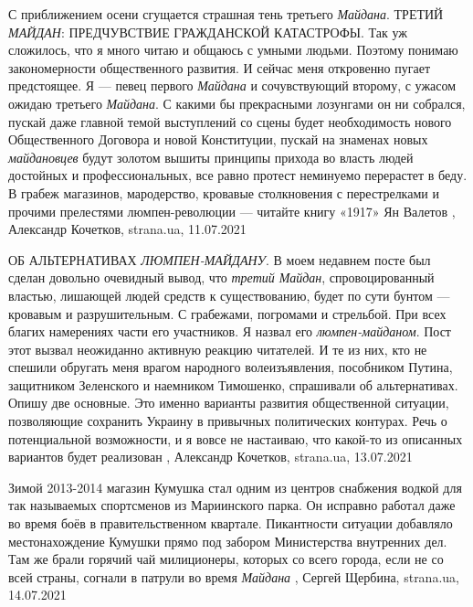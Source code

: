 С приближением осени сгущается страшная тень третьего \emph{Майдана}. ТРЕТИЙ \emph{МАЙДАН}:
ПРЕДЧУВСТВИЕ ГРАЖДАНСКОЙ КАТАСТРОФЫ.  Так уж сложилось, что я много читаю и
общаюсь с умными людьми. Поэтому понимаю закономерности общественного развития.
И сейчас меня откровенно пугает предстоящее. Я — певец первого \emph{Майдана} и
сочувствующий второму, с ужасом ожидаю третьего \emph{Майдана}.  С какими бы
прекрасными лозунгами он ни собрался, пускай даже главной темой выступлений со
сцены будет необходимость нового Общественного Договора и новой Конституции,
пускай на знаменах новых \emph{майдановцев} будут золотом вышиты принципы прихода во
власть людей достойных и профессиональных, все равно протест неминуемо
перерастет в беду. В грабеж магазинов, мародерство, кровавые столкновения с
перестрелками и прочими прелестями люмпен-революции — читайте книгу «1917» Ян
Валетов
, 
Александр Кочетков, strana.ua, 11.07.2021

ОБ АЛЬТЕРНАТИВАХ \emph{ЛЮМПЕН-МАЙДАНУ}.
В моем недавнем посте был сделан довольно очевидный вывод, что \emph{третий Майдан},
спровоцированный властью, лишающей людей средств к существованию, будет по сути
бунтом — кровавым и разрушительным. С грабежами, погромами и стрельбой. При
всех благих намерениях части его участников. Я назвал его \emph{люмпен-майданом}.
Пост этот вызвал неожиданно активную реакцию читателей. И те из них, кто не
спешили обругать меня врагом народного волеизъявления, пособником Путина,
защитником Зеленского и наемником Тимошенко, спрашивали об альтернативах.
Опишу две основные. Это именно варианты развития общественной ситуации,
позволяющие сохранить Украину в привычных политических контурах. Речь о
потенциальной возможности, и я вовсе не настаиваю, что какой-то из описанных
вариантов будет реализован
, 
Александр Кочетков, strana.ua, 13.07.2021

Зимой 2013-2014 магазин Кумушка стал одним из центров снабжения водкой для так
называемых спортсменов из Мариинского парка. Он исправно работал даже во время
боёв в правительственном квартале. Пикантности ситуации добавляло
местонахождение Кумушки прямо под забором Министерства внутренних дел. Там же
брали горячий чай милиционеры, которых со всего города, если не со всей страны,
согнали в патрули во время \emph{Майдана}
, 
Сергей Щербина, strana.ua, 14.07.2021

